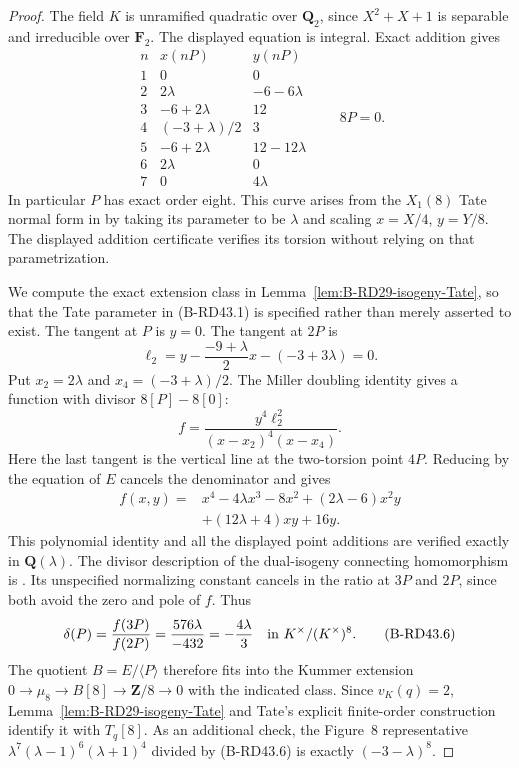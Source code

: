 \begin{proof}
The field $K$ is unramified quadratic over $\mathbf Q_2$, since
$X^2+X+1$ is separable and irreducible over $\mathbf F_2$.
The displayed equation is integral. Exact addition gives
\[
\begin{array}{c|c|c}
 n&x(nP)&y(nP)\\\hline
 1&0&0\\
 2&2\lambda&-6-6\lambda\\
 3&-6+2\lambda&12\\
 4&(-3+\lambda)/2&3\\
 5&-6+2\lambda&12-12\lambda\\
 6&2\lambda&0\\
 7&0&4\lambda
\end{array}
\qquad 8P=0.
                                                        \tag{B-RD43.4}
\]
In particular $P$ has exact order eight. This curve arises from
the $X_1(8)$ Tate normal form in
\citet[Appendix~A.2, pp.~26--27, Figure~8]{AntieauAuel2021Descent}
by taking its parameter to be $\lambda$ and scaling
$x=X/4$, $y=Y/8$. The displayed addition certificate verifies
its torsion without relying on that parametrization.

We compute the exact extension class in
Lemma~\ref{lem:B-RD29-isogeny-Tate}, so that the Tate parameter
in (B-RD43.1) is specified rather than merely asserted to exist.
The tangent at $P$ is $y=0$. The tangent at $2P$ is
\[
 \ell_2=y-\frac{-9+\lambda}{2}x-(-3+3\lambda)=0.
\]
Put $x_2=2\lambda$ and $x_4=(-3+\lambda)/2$.
The Miller doubling identity gives a function with divisor
$8[P]-8[0]$:
\[
 f=\frac{y^4\ell_2^2}{(x-x_2)^4(x-x_4)}.
\]
Here the last tangent is the vertical line at the two-torsion point
$4P$. Reducing by the equation of $E$ cancels the denominator and gives
\[
\begin{split}
 f(x,y)={}&x^4-4\lambda x^3-8x^2
            +(2\lambda-6)x^2y\\
          &+(12\lambda+4)xy+16y.
\end{split}                                             \tag{B-RD43.5}
\]
This polynomial identity and all the displayed point additions
are verified exactly in $\mathbf Q(\lambda)$.
The divisor description of the dual-isogeny connecting homomorphism
is \citet[Appendix~A.1, Lemmas~A.1--A.2, p.~22]
{AntieauAuel2021Descent}. Its unspecified normalizing constant
cancels in the ratio at $3P$ and $2P$, since both avoid the zero
and pole of $f$. Thus
\[
 \delta(P)=\frac{f(3P)}{f(2P)}
           =\frac{576\lambda}{-432}
           =-\frac{4\lambda}{3}
                   \quad\hbox{in }K^\times/(K^\times)^8.
                                                        \tag{B-RD43.6}
\]
The quotient $B=E/\langle P\rangle$ therefore fits into the
Kummer extension
$0\to\mu_8\to B[8]\to\mathbf Z/8\to0$ with the indicated
class. Since $v_K(q)=2$, Lemma~\ref{lem:B-RD29-isogeny-Tate}
and Tate's explicit finite-order construction identify it with
$T_q[8]$. As an additional check, the Figure~8 representative
$\lambda^7(\lambda-1)^6(\lambda+1)^4$ divided by (B-RD43.6)
is exactly $(-3-\lambda)^8$.


\end{proof}
